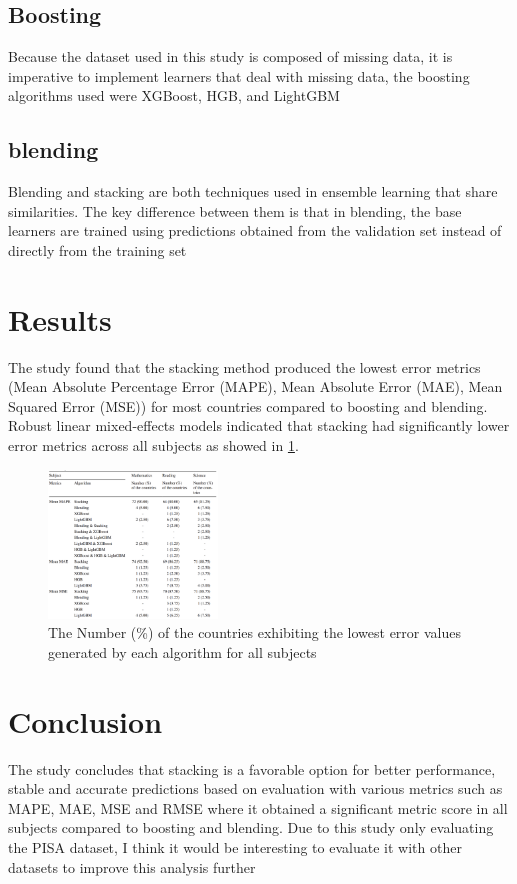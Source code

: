 \documentclass[final,5p,times,twocolumn,authoryear]{elsarticle}
\begin{document}
\subsection{Boosting}
Because the dataset used in this study is composed of missing data, it is imperative to implement learners that deal with missing data, the boosting algorithms used were XGBoost, HGB, and LightGBM \cite{Stacking}
\subsection{blending}
Blending and stacking are both techniques used in ensemble learning that share similarities. The key difference between them is that in blending, the base learners are trained using predictions obtained from the validation set instead of directly from the training set\cite{Stacking}
\section{Results}
The study found that the stacking method produced the lowest error metrics (Mean Absolute Percentage Error (MAPE), Mean Absolute Error (MAE), Mean Squared Error (MSE)) for most countries compared to boosting and blending. Robust linear mixed-effects models indicated that stacking had significantly lower error metrics across all subjects as showed in \ref{fig:results}.

\begin{figure}
  \centering
  \includegraphics[width=0.4\textwidth]{figures/figure1}
  \caption{The Number (\%) of the countries exhibiting the lowest error values generated by each algorithm for all subjects \cite{Stacking}}
  \label{fig:results}
\end{figure}

\section{Conclusion}
The study \cite{Stacking} concludes that stacking is a favorable option for better performance, stable and accurate predictions based on evaluation with various metrics such as MAPE, MAE, MSE and RMSE where it obtained a significant metric score in all subjects compared to boosting and blending.
Due to this study only evaluating the PISA dataset, I think it would be interesting to evaluate it with other datasets to improve this analysis further
\end{document}

